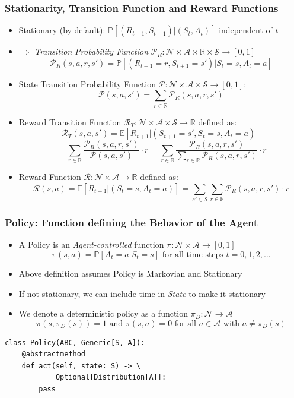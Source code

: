 \documentclass[handout]{beamer}
\begin{document}
\begin{frame}
\frametitle{Stationarity, Transition Function and Reward Functions}
\pause
\begin{itemize}[<+->]
\item Stationary (by default): $\mathbb{P}[(R_{t+1}, S_{t+1}) | (S_t, A_t)]$ independent of $t$
\item $\Rightarrow$ {\em Transition Probability Function} $\mathcal{P}_R: \mathcal{N} \times \mathcal{A} \times \mathbb{R} \times \mathcal{S} \rightarrow [0,1]$
$$\mathcal{P}_R(s,a,r,s') = \mathbb{P}[(R_{t+1}=r, S_{t+1}=s') | S_t=s, A_t = a]$$
\item State Transition Probability Function $\mathcal{P}: \mathcal{N} \times \mathcal{A} \times \mathcal{S} \rightarrow [0,1]$:
$$\mathcal{P}(s, a, s') = \sum_{r\in \mathbb{R}} \mathcal{P}_R(s, a, r, s')$$
\item Reward Transition Function $\mathcal{R}_T: \mathcal{N} \times \mathcal{A} \times \mathcal{S} \rightarrow \mathbb{R}$ defined as:
$$\mathcal{R}_T(s,a,s') = \mathbb{E}[R_{t+1}|(S_{t+1}=s',S_t=s,A_t=a)]$$
$$ = \sum_{r\in \mathbb{R}} \frac {\mathcal{P}_R(s,a,r,s')} {\mathcal{P}(s,a,s')} \cdot r = \sum_{r\in \mathbb{R}} \frac {\mathcal{P}_R(s,a,r,s')} {\sum_{r\in \mathbb{R}} \mathcal{P}_R(s,a,r,s')} \cdot r$$
\item Reward Function $\mathcal{R}: \mathcal{N} \times \mathcal{A} \rightarrow \mathbb{R}$ defined as:
$$\mathcal{R}(s,a) = \mathbb{E}[R_{t+1}|(S_t=s, A_t=a)] = \sum_{s'\in \mathcal{S}} \sum_{r\in\mathbb{R}} \mathcal{P}_R(s,a,r,s') \cdot r$$
\end{itemize}
\end{frame}

\begin{frame}[fragile]
\frametitle{Policy: Function defining the Behavior of the Agent}
\pause
\begin{itemize}[<+->]
\item A Policy is an {\em Agent-controlled} function $\pi: \mathcal{N} \times \mathcal{A} \rightarrow [0,1]$
$$\pi(s, a) = \mathbb{P}[A_t = a|S_t = s] \text{ for all time steps } t = 0, 1, 2, \ldots$$
\item Above definition assumes Policy is Markovian and Stationary
\item If not stationary, we can include time in {\em State} to make it stationary
\item We denote a deterministic policy as a function $\pi_D: \mathcal{N} \rightarrow \mathcal{A}$
$$\pi(s, \pi_D(s)) = 1 \text{ and } \pi(s, a) = 0 \text{ for all } a\in \mathcal{A} \text{ with } a \neq \pi_D(s)$$
\end{itemize}
\pause
\begin{lstlisting}
class Policy(ABC, Generic[S, A]):
    @abstractmethod
    def act(self, state: S) -> \
            Optional[Distribution[A]]:
        pass
\end{lstlisting}
\end{frame}
\end{document}
